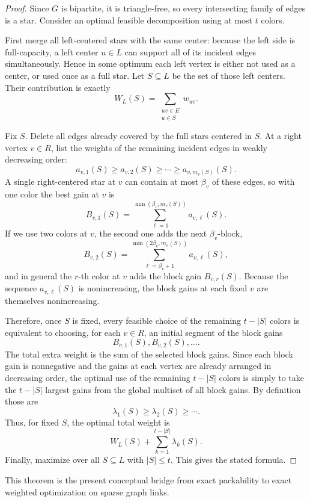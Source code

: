 \documentclass[11pt]{article}
\theoremstyle{definition}
\begin{document}
\begin{proof}
Since \(G\) is bipartite, it is triangle-free, so every intersecting family of edges is a star. Consider an optimal feasible decomposition using at most \(t\) colors.

First merge all left-centered stars with the same center: because the left side is full-capacity, a left center \(u\in L\) can support all of its incident edges simultaneously. Hence in some optimum each left vertex is either not used as a center, or used once as a full star. Let \(S\subseteq L\) be the set of those left centers. Their contribution is exactly
\[
W_L(S)=\sum_{\substack{uv\in E\\ u\in S}} w_{uv}.
\]

Fix \(S\). Delete all edges already covered by the full stars centered in \(S\). At a right vertex \(v\in R\), list the weights of the remaining incident edges in weakly decreasing order:
\[
a_{v,1}(S)\ge a_{v,2}(S)\ge \cdots \ge a_{v,m_v(S)}(S).
\]
A single right-centered star at \(v\) can contain at most \(\beta_v\) of these edges, so with one color the best gain at \(v\) is
\[
B_{v,1}(S)=\sum_{\ell=1}^{\min(\beta_v,m_v(S))} a_{v,\ell}(S).
\]
If we use two colors at \(v\), the second one adds the next \(\beta_v\)-block,
\[
B_{v,2}(S)=\sum_{\ell=\beta_v+1}^{\min(2\beta_v,m_v(S))} a_{v,\ell}(S),
\]
and in general the \(r\)-th color at \(v\) adds the block gain \(B_{v,r}(S)\). Because the sequence \(a_{v,\ell}(S)\) is nonincreasing, the block gains at each fixed \(v\) are themselves nonincreasing.

Therefore, once \(S\) is fixed, every feasible choice of the remaining \(t-|S|\) colors is equivalent to choosing, for each \(v\in R\), an initial segment of the block gains
\[
B_{v,1}(S),B_{v,2}(S),\dots.
\]
The total extra weight is the sum of the selected block gains. Since each block gain is nonnegative and the gains at each vertex are already arranged in decreasing order, the optimal use of the remaining \(t-|S|\) colors is simply to take the \(t-|S|\) largest gains from the global multiset of all block gains. By definition those are
\[
\lambda_1(S)\ge \lambda_2(S)\ge \cdots.
\]
Thus, for fixed \(S\), the optimal total weight is
\[
W_L(S)+\sum_{k=1}^{t-|S|} \lambda_k(S).
\]
Finally, maximize over all \(S\subseteq L\) with \(|S|\le t\). This gives the stated formula.
\end{proof}

This theorem is the present conceptual bridge from exact packability to exact weighted optimization on sparse graph links.
\end{document}
